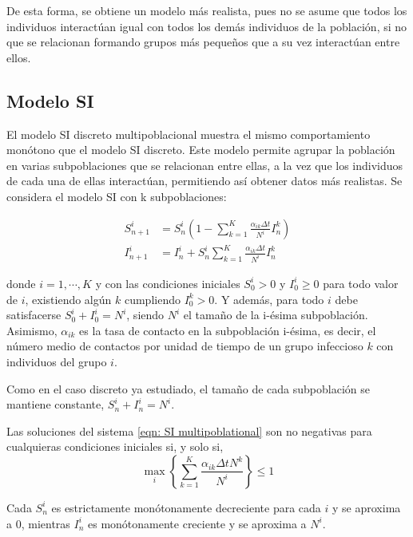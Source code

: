 De esta forma, se obtiene un modelo más realista, pues no se asume que todos los individuos interactúan igual con todos los demás individuos de la población, si no que se relacionan formando grupos más pequeños que a su vez interactúan entre ellos.

\subsection{Modelo SI}

El modelo SI discreto multipoblacional muestra el mismo comportamiento monótono que el modelo SI discreto. Este modelo permite agrupar la población en varias subpoblaciones que se relacionan entre ellas, a la vez que los individuos de cada una de ellas interactúan, permitiendo así obtener datos más realistas. Se considera el modelo SI con k subpoblaciones:

\begin{equation}
\label{eqn: SI multipoblational}
\begin{aligned}
S_{n+1}^i &= S_n^i \left( 1- \sum_{k=1}^{K} \frac{\alpha_{ik}\Delta t}{N^i}I_n^k \right) \\
I_{n+1}^i &= I_n^i + S_n^i \sum_{k=1}^{K} \frac{\alpha_{ik}\Delta t}{N^i}I_n^k
\end {aligned}
\end{equation}

donde $i=1, \cdots , K$ y con las condiciones iniciales $S_0^i > 0$ y $I_0^i\geq 0$ para todo valor de $i$, existiendo algún $k$ cumpliendo $I_0^k>0$. Y además, para todo $i$ debe satisfacerse $S_0^i+I_0^i=N^i$, siendo $N^i$ el tamaño de la i-ésima subpoblación. Asimismo, $\alpha_{ik}$ es la tasa de contacto en la subpoblación i-ésima, es decir, el número medio de contactos por unidad de tiempo de un grupo infeccioso $k$ con individuos del grupo $i$.

Como en el caso discreto ya estudiado, el tamaño de cada subpoblación se mantiene constante, $S_n^i+I_n^i=N^i$.

\begin{proposition}
Las soluciones del sistema \eqref{eqn: SI multipoblational} son no negativas para cualquieras condiciones iniciales si, y solo si,
$$\max_i \left\{ \sum_{k=1}^{K} \frac{\alpha_{ik}\Delta t N^k}{N^i} \right\} \leq 1$$
\end{proposition}

\begin{proposition}
Cada $S_n^i$ es estrictamente monótonamente decreciente para cada $i$ y se aproxima a $0$, mientras $I_n^i$ es monótonamente creciente y se aproxima a $N^i$. 
\end{proposition}



